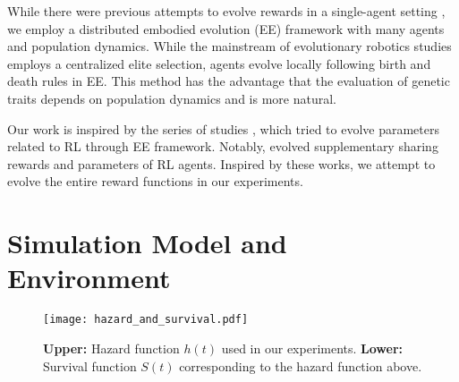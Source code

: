 While there were previous attempts to evolve rewards in a single-agent setting \citep{singhWhereRewardsCome2009,niekumEvolutionRewardFunctions2011,zhengWhatCanLearned2020},
we employ a distributed embodied evolution (EE) framework \citep{watsonEmbodiedEvolutionDistributing2002,bredecheEmbodiedEvolutionCollective2018} with many agents and population dynamics.
While the mainstream of evolutionary robotics studies \citep{nolfiEvolutionaryRoboticsBiology2004} employs a centralized elite selection, agents evolve locally following birth and death rules in EE. This method has the advantage that the evaluation of genetic traits depends on population dynamics and is more natural.

Our work is inspired by the series of studies \citep{elfwingBiologicallyInspiredEmbodied2005,elfwingDarwinianEmbodiedEvolution2011,elfwingEmergencePolymorphicMating2014}, which tried to evolve parameters related to RL through EE framework. Notably, \citet{elfwingDarwinianEmbodiedEvolution2011} evolved supplementary sharing rewards and parameters of RL agents.
Inspired by these works, we attempt to evolve the entire reward functions in our experiments.

\section{Simulation Model and Environment}\label{sec:method}

\begin{figure}[t]
  \centering{}
  \texttt{[image: hazard\_and\_survival.pdf]}
  \caption{
    \textbf{Upper:} Hazard function $h(t)$ used in our experiments.
    \textbf{Lower:} Survival function $S(t)$ corresponding to the hazard function above.
  }\label{figure:hs}
\end{figure}


